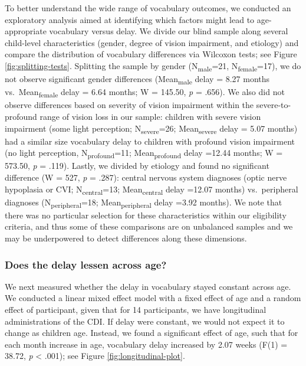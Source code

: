 \documentclass[
  man,floatsintext]{apa6}
\begin{document}
To better understand the wide range of vocabulary outcomes, we conducted an exploratory analysis aimed at identifying which factors might lead to age-appropriate vocabulary versus delay. We divide our blind sample along several child-level characteristics (gender, degree of vision impairment, and etiology) and compare the distribution of vocabulary differences via Wilcoxon tests; see Figure \ref{fig:splitting-tests}. Splitting the sample by gender (N\textsubscript{male}=21, N\textsubscript{female}=17), we do not observe significant gender differences (Mean\textsubscript{male} delay = 8.27 months vs.~Mean\textsubscript{female} delay = 6.64 months; W = 145.50, \emph{p} = .656). We also did not observe differences based on severity of vision impairment within the severe-to-profound range of vision loss in our sample: children with severe vision impairment (some light perception; N\textsubscript{severe}=26; Mean\textsubscript{severe} delay = 5.07 months) had a similar size vocabulary delay to children with profound vision impairment (no light perception, N\textsubscript{profound}=11; Mean\textsubscript{profound} delay =12.44 months; W = 573.50, \emph{p} = .119). Lastly, we divided by etiology and found no significant difference (W = 527, \emph{p} = .287): central nervous system diagnoses (optic nerve hypoplasia or CVI; N\textsubscript{central}=13; Mean\textsubscript{central} delay =12.07 months) vs.~peripheral diagnoses (N\textsubscript{peripheral}=18; Mean\textsubscript{peripheral} delay =3.92 months). We note that there was no particular selection for these characteristics within our eligibility criteria, and thus some of these comparisons are on unbalanced samples and we may be underpowered to detect differences along these dimensions.

\hypertarget{does-the-delay-lessen-across-age}{%
\subsubsection{Does the delay lessen across age?}\label{does-the-delay-lessen-across-age}}

We next measured whether the delay in vocabulary stayed constant across age. We conducted a linear mixed effect model with a fixed effect of age and a random effect of participant, given that for 14 participants, we have longitudinal administrations of the CDI. If delay were constant, we would not expect it to change as children age. Instead, we found a significant effect of age, such that for each month increase in age, vocabulary delay increased by 2.07 weeks (F(1) = 38.72, \emph{p} \textless{} .001); see Figure \ref{fig:longitudinal-plot}.
\end{document}
